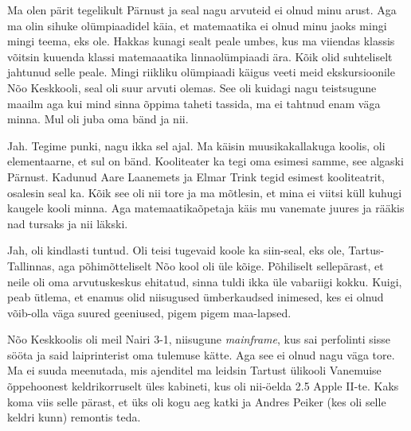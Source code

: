 

Ma olen pärit tegelikult Pärnust ja seal nagu arvuteid ei olnud minu arust. Aga ma olin sihuke olümpiaadidel käia, et matemaatika ei olnud minu jaoks mingi mingi teema, eks ole. Hakkas kunagi sealt peale umbes, kus ma viiendas klassis võitsin kuuenda klassi matemaaatika linnaolümpiaadi ära. Kõik olid suhteliselt jahtunud selle peale. Mingi riikliku olümpiaadi käigus veeti meid ekskursioonile Nõo Keskkooli, seal oli suur arvuti olemas. See oli  kuidagi nagu teistsugune maailm aga kui mind sinna õppima taheti tassida, ma ei tahtnud enam väga minna. Mul oli juba oma bänd ja nii.


Jah. Tegime punki, nagu ikka sel ajal. Ma käisin muusikakallakuga koolis, oli elementaarne, et sul on bänd. Kooliteater ka tegi oma esimesi samme, see algaski Pärnust. Kadunud Aare Laanemets ja Elmar Trink tegid  esimest kooliteatrit, osalesin seal ka. Kõik see oli nii tore ja ma mõtlesin, et mina ei viitsi küll kuhugi kaugele kooli minna. Aga matemaatikaõpetaja käis mu vanemate juures ja rääkis nad tursaks ja nii läkski. 


Jah, oli kindlasti tuntud. Oli teisi tugevaid koole ka siin-seal, eks ole, Tartus-Tallinnas,  aga põhimõtteliselt Nõo kool oli üle kõige. Põhiliselt sellepärast, et neile oli oma arvutuskeskus ehitatud, sinna tuldi ikka üle vabariigi kokku. Kuigi, peab ütlema, et enamus olid niisugused ümberkaudsed inimesed, kes ei olnud võib-olla väga suured geeniused,  pigem pigem maa-lapsed. 

Nõo Keskkoolis oli meil  Nairi 3-1, niisugune \emph{mainframe}, kus sai perfolinti sisse sööta ja said laiprinterist oma tulemuse kätte. Aga see ei olnud nagu väga tore. Ma ei suuda meenutada, mis ajenditel ma leidsin Tartust ülikooli Vanemuise õppehoonest  keldrikorruselt üles kabineti, kus oli nii-öelda 2.5 Apple II-te. Kaks koma viis selle pärast, et üks oli kogu aeg katki ja Andres Peiker (kes oli selle keldri kunn) remontis teda.

